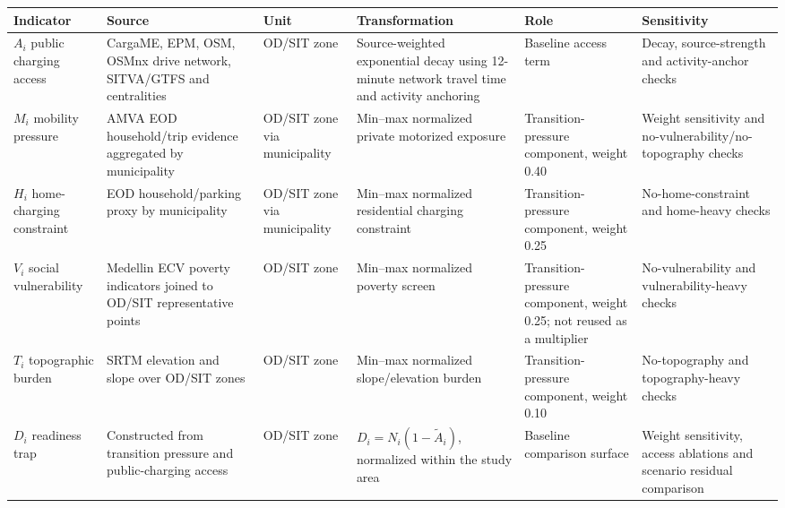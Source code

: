 \begin{tabular}{p{}p{}p{}p{}p{}p{}}
\toprule
Indicator & Source & Unit & Transformation & Role & Sensitivity \\
\midrule
$A_i$ public charging access & CargaME, EPM, OSM, OSMnx drive network, SITVA/GTFS and centralities & OD/SIT zone & Source-weighted exponential decay using 12-minute network travel time and activity anchoring & Baseline access term & Decay, source-strength and activity-anchor checks \\
$M_i$ mobility pressure & AMVA EOD household/trip evidence aggregated by municipality & OD/SIT zone via municipality & Min--max normalized private motorized exposure & Transition-pressure component, weight 0.40 & Weight sensitivity and no-vulnerability/no-topography checks \\
$H_i$ home-charging constraint & EOD household/parking proxy by municipality & OD/SIT zone via municipality & Min--max normalized residential charging constraint & Transition-pressure component, weight 0.25 & No-home-constraint and home-heavy checks \\
$V_i$ social vulnerability & Medellin ECV poverty indicators joined to OD/SIT representative points & OD/SIT zone & Min--max normalized poverty screen & Transition-pressure component, weight 0.25; not reused as a multiplier & No-vulnerability and vulnerability-heavy checks \\
$T_i$ topographic burden & SRTM elevation and slope over OD/SIT zones & OD/SIT zone & Min--max normalized slope/elevation burden & Transition-pressure component, weight 0.10 & No-topography and topography-heavy checks \\
$D_i$ readiness trap & Constructed from transition pressure and public-charging access & OD/SIT zone & $D_i=N_i(1-\widetilde{A}_i)$, normalized within the study area & Baseline comparison surface & Weight sensitivity, access ablations and scenario residual comparison \\
\bottomrule
\end{tabular}
